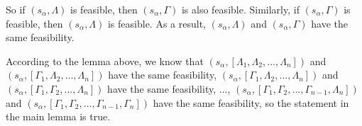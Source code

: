 \documentclass[journal]{IEEEtran}
\begin{document}
So if $(s_\alpha, \Lambda)$ is feasible, then $(s_\alpha, \Gamma)$ is also feasible. Similarly, if $(s_\alpha, \Gamma)$ is
feasible, then $(s_\alpha, \Lambda)$ is feasible. As a result, $(s_\alpha, \Lambda)$ and $(s_\alpha, \Gamma)$ have the same feasibility.
\hfill\QED

According to the lemma above, we know that
$(s_\alpha, [\Lambda_1,\Lambda_2,...,\Lambda_n])$ and $(s_\alpha, [\Gamma_1,\Lambda_2,...,\Lambda_n])$ have the same feasibility,
$(s_\alpha, [\Gamma_1,\Lambda_2,...,\Lambda_n])$ and $(s_\alpha, [\Gamma_1,\Gamma_2,...,\Lambda_n])$ have the same feasibility, ...,
$(s_\alpha, [\Gamma_1,\Gamma_2,...,\Gamma_{n-1}, \Lambda_n])$ and $(s_\alpha, [\Gamma_1,\Gamma_2,...,\Gamma_{n-1},\Gamma_n])$ have the same feasibility, so
the statement in the main lemma is true.

%
%



%
%
\end{document}
